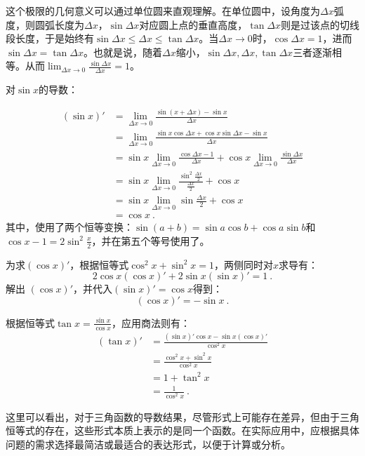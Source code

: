 这个极限的几何意义可以通过单位圆来直观理解。在单位圆中，设角度为$\Delta x$弧度，则圆弧长度为$\Delta x$，$\sin\Delta x$对应圆上点的垂直高度，$\tan\Delta x$则是过该点的切线段长度，于是始终有$\sin\Delta x \leq \Delta x \leq \tan\Delta x$。当$\Delta x \to 0$时，$\cos \Delta x=1$，进而$\sin\Delta x=\tan\Delta x$。也就是说，随着$\Delta x$缩小，$\sin\Delta x,\Delta x,\tan\Delta x$三者逐渐相等。从而$\displaystyle\lim_{\Delta x \to 0} \frac{\sin\Delta x}{\Delta x} = 1$。

对$\sin x$的导数：

\begin{equation}
\begin{split}
\left(\sin x\right)' &= \lim_{\Delta x \to 0}\frac{\sin (x+\Delta x)-\sin x}{\Delta x} \\
&= \lim_{\Delta x \to 0}\frac{\sin x\cos\Delta x+\cos x\sin\Delta x-\sin x}{\Delta x} \\
&= \sin x\lim_{\Delta x \to 0}\frac{\cos\Delta x-1}{\Delta x}+\cos x\lim_{\Delta x \to 0}\frac{\sin\Delta x} {\Delta x}\\
&= \sin x\lim_{\Delta x \to 0}\frac{\sin^2\frac{\Delta x}{2}}{\frac{\Delta x}{2}}+\cos x\\
&= \sin x\lim_{\Delta x \to 0}\sin\frac{\Delta x}{2}+\cos x\\
&=\cos x~.
\end{split}
\end{equation}
其中，使用了两个恒等变换：$\sin (a+b)=\sin a\cos b+\cos a\sin b$和$\displaystyle\cos x-1=2\sin^2\frac{x}{2}$，并在第五个等号使用了。

为求$(\cos x)'$，根据恒等式$\cos^2 x+\sin^2 x=1$，两侧同时对$x$求导有：
\begin{equation}
2\cos x(\cos x)'+2\sin x(\sin x)'=1~.
\end{equation}
解出 $(\cos x)'$，并代入$(\sin x)'=\cos x$得到：
\begin{equation}
(\cos x)'=-\sin x~.
\end{equation}

根据恒等式$\displaystyle\tan x=\frac{\sin x}{\cos x}$，应用商法则有：
\begin{equation}
\begin{split}
(\tan x)'&=\frac{(\sin x)'\cos x-\sin x(\cos x)'}{\cos^2 x}\\
&=\frac{\cos^2 x+\sin^2 x}{\cos^2 x}\\
&=1+\tan^2 x\\
&=\frac{1}{\cos^2 x}~.
\end{split}
\end{equation}

这里可以看出，对于三角函数的导数结果，尽管形式上可能存在差异，但由于三角恒等式的存在，这些形式本质上表示的是同一个函数。在实际应用中，应根据具体问题的需求选择最简洁或最适合的表达形式，以便于计算或分析。